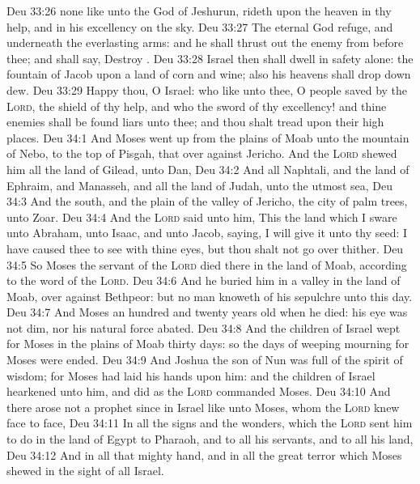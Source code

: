 \vs Deu 33:26  none like unto the God of Jeshurun,  rideth upon the heaven in thy help, and in his excellency on the sky.
\vs Deu 33:27 The eternal God  refuge, and underneath  the everlasting arms: and he shall thrust out the enemy from before thee; and shall say, Destroy .
\vs Deu 33:28 Israel then shall dwell in safety alone: the fountain of Jacob  upon a land of corn and wine; also his heavens shall drop down dew.
\vs Deu 33:29 Happy  thou, O Israel: who  like unto thee, O people saved by the \textsc{Lord}, the shield of thy help, and who  the sword of thy excellency! and thine enemies shall be found liars unto thee; and thou shalt tread upon their high places.
\vs Deu 34:1 And Moses went up from the plains of Moab unto the mountain of Nebo, to the top of Pisgah, that  over against Jericho. And the \textsc{Lord} shewed him all the land of Gilead, unto Dan,
\vs Deu 34:2 And all Naphtali, and the land of Ephraim, and Manasseh, and all the land of Judah, unto the utmost sea,
\vs Deu 34:3 And the south, and the plain of the valley of Jericho, the city of palm trees, unto Zoar.
\vs Deu 34:4 And the \textsc{Lord} said unto him, This  the land which I sware unto Abraham, unto Isaac, and unto Jacob, saying, I will give it unto thy seed: I have caused thee to see  with thine eyes, but thou shalt not go over thither.
\vs Deu 34:5 So Moses the servant of the \textsc{Lord} died there in the land of Moab, according to the word of the \textsc{Lord}.
\vs Deu 34:6 And he buried him in a valley in the land of Moab, over against Bethpeor: but no man knoweth of his sepulchre unto this day.
\vs Deu 34:7 And Moses  an hundred and twenty years old when he died: his eye was not dim, nor his natural force abated.
\vs Deu 34:8 And the children of Israel wept for Moses in the plains of Moab thirty days: so the days of weeping  mourning for Moses were ended.
\vs Deu 34:9 And Joshua the son of Nun was full of the spirit of wisdom; for Moses had laid his hands upon him: and the children of Israel hearkened unto him, and did as the \textsc{Lord} commanded Moses.
\vs Deu 34:10 And there arose not a prophet since in Israel like unto Moses, whom the \textsc{Lord} knew face to face,
\vs Deu 34:11 In all the signs and the wonders, which the \textsc{Lord} sent him to do in the land of Egypt to Pharaoh, and to all his servants, and to all his land,
\vs Deu 34:12 And in all that mighty hand, and in all the great terror which Moses shewed in the sight of all Israel.
